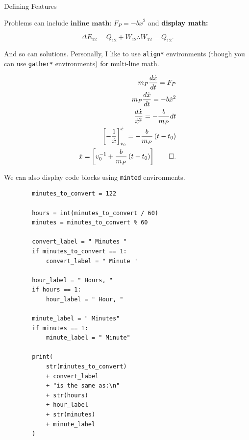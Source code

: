 \begin{hwkProblem}{2}{Defining Features}
		
	Problems can include \( \textbf{inline math: } F_{P} = - b \dot{x}^{2} \) and \textbf{display math:}

	\[
		\Delta E_{12} = Q_{12} + W_{12} \therefore W_{12} = Q_{12}
	.\]
	
	\hwkSol{}

	And so can solutions. Personally, I like to use \texttt{align*} environments (though you can use \texttt{gather*} environments) for multi-line math.

	\begin{align*}
		m_{P} \frac{d\dot{x}}{dt}                             = F_{P}                                     \\
		m_{P} \frac{d\dot{x}}{dt}                             = -b\dot{x}^{2}                             \\
		\frac{d\dot{x}}{\dot{x}^2}                            = - \frac{b}{m_{P}} dt                      \\
		{\left[ - \frac{1}{\dot{x}} \right]}^{\dot{x}}_{v_{0}}  = - \frac{b}{m_{P}} \left( t - t_{0} \right) \\
		\dot{x}                                               = \left[ v_{0}^{-1} + \frac{b}{m_{P}} \left( t - t_{0} \right) \right] \qed
	.\end{align*}

	We can also display code blocks using \texttt{minted} environments.

	\begin{verbatim}
		minutes_to_convert = 122

		hours = int(minutes_to_convert / 60)
		minutes = minutes_to_convert % 60

		convert_label = " Minutes "
		if minutes_to_convert == 1:
		    convert_label = " Minute "

		hour_label = " Hours, "
		if hours == 1:
		    hour_label = " Hour, "

		minute_label = " Minutes"
		if minutes == 1:
		    minute_label = " Minute"

		print(
		    str(minutes_to_convert)
		    + convert_label
		    + "is the same as:\n"
		    + str(hours)
		    + hour_label
		    + str(minutes)
		    + minute_label
		)
	\end{verbatim}

\end{hwkProblem}


